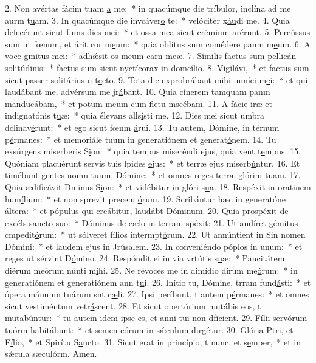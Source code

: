 2. Non avértas fácim tuam \uline{a} me:~* in quacúmque die tríbulor, inclína ad me aurm t\uline{u}am.
3. In quacúmque die invcáver\uline{o} te:~* velóciter x\uline{áu}di me.
4. Quia defecérunt sicut fums dies m\uline{e}i:~* et ossa mea sicut crémium ar\uline{é}runt.
5. Percússus sum ut fœnum, et árit cor m\uline{e}um:~* quia oblítus sum comédere panm m\uline{e}um.
6. A voce gmitus m\uline{e}i:~* adhǽsit os meum carn m\uline{e}æ.
7. Símilis factus sum pellicán solit\uline{ú}dinis:~* factus sum sicut nyctícorax in domc\uline{í}lio.
8. Vigil\uline{á}vi,~* et factus sum sicut passer solitárius n t\uline{e}cto.
9. Tota die exprobrábant mihi inmíci m\uline{e}i:~* et qui laudábant me, advérsum me jr\uline{á}bant.
10. Quia cínerem tamquam panm manduc\uline{á}bam,~* et potum meum cum fletu msc\uline{é}bam.
11. A fácie iræ et indignatónis t\uline{u}æ:~* quia élevans alls\uline{í}sti me.
12. Dies mei sicut umbra dclinav\uline{é}runt:~* et ego sicut fœnm \uline{á}rui.
13. Tu autem, Dómine, in térnum p\uline{é}rmanes:~* et memoriále tuum in generatiónem et generat\uline{ó}nem.
14. Tu exsúrgens miserberis S\uline{i}on:~* quia tempus miseréndi ejus, quia vent t\uline{e}mpus.
15. Quóniam placuérunt servis tuis lpides \uline{e}jus:~* et terræ ejus miserb\uline{ú}ntur.
16. Et timébunt gentes nomn tuum, D\uline{ó}mine:~* et omnes reges terræ glórim t\uline{u}am.
17. Quia ædificávit Dminus S\uline{i}on:~* et vidébitur in glóri s\uline{u}a.
18. Respéxit in oratinem hum\uline{í}lium:~* et non sprevit precem \uline{ó}rum.
19. Scribántur hæc in generatóne \uline{á}ltera:~* et pópulus qui creábitur, laudábt D\uline{ó}minum.
20. Quia prospéxit de excéls sancto s\uline{u}o:~* Dóminus de cælo in terram sp\uline{é}xit:
21. Ut audíret gémitus cmpedit\uline{ó}rum:~* ut sólveret fílios intermpt\uline{ó}rum.
22. Ut annúntient in Sin nomen D\uline{ó}mini:~* et laudem ejus in Jr\uline{ú}salem.
23. In conveniéndo póplos in \uline{u}num:~* et reges ut sérvint D\uline{ó}mino.
24. Respóndit ei in via vrtútis s\uline{u}æ:~* Paucitátem diérum meórum núnti m\uline{i}hi.
25. Ne révoces me in dimídio dirum me\uline{ó}rum:~* in generatiónem et generatiónem ann t\uline{u}i.
26. Inítio tu, Dómine, trram fund\uline{á}sti:~* et ópera mánuum tuárum snt c\uline{æ}li.
27. Ipsi períbunt, t autem p\uline{é}rmanes:~* et omnes sicut vestiméntum vetr\uline{á}scent.
28. Et sicut opertórium mutábis eos, t mutab\uline{ú}ntur:~* tu autem idem ipse es, et anni tui non df\uline{í}cient.
29. Fílii servórum tuórm habit\uline{á}bunt:~* et semen eórum in sǽculum dirg\uline{é}tur.
30. Glória Ptri, et F\uline{í}lio,~* et Spirítu S\uline{a}ncto.
31. Sicut erat in princípio, t nunc, et s\uline{e}mper,~* et in sǽcula sæculórm. \uline{A}men.

